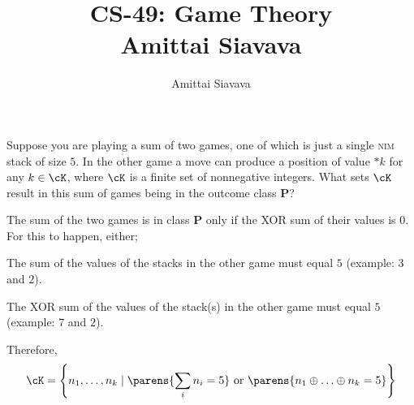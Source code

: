 \documentclass[11pt, reqno]{amsart}
\begin{document}

\title{CS-49: Game Theory\\ Amittai Siavava \\ }
\author{Amittai Siavava}


\setlength{\headheight}{13.0pt}
\setlength{\footskip}{15.0pt}

\maketitle

\bigskip

\def \cram { \textsc{cram} }
\def \dom { \textsc{domineering} }
\def \sub { \textsc{subtraction} }
\def \weighted { \textsc{weighted odds and evens}}
\def \nim { \textsc{nim} }
\def \P { \mathbf{P}}

\newpage
\begin{problem}[10]
  Suppose you are playing a sum of two games,
  one of which is just a single \nim stack of size $5$.
  In the other game a move can produce a position of value $\ast k$ for any $k \in \cK$,
  where $\cK$ is a finite set of nonnegative integers.
  What sets $\cK$ result in this sum of games being in the outcome class $\P$?

  The sum of the two games is in class $\P$ only if the XOR sum of their values is $0$.
  For this to happen, either;
  \begin{enumarabic}
    \item The sum of the values of the stacks in the other game must equal $5$
      (example: $3$ and $2$).
    \item The XOR sum of the values of the stack(s) in the other game must equal $5$
      (example: $7$ and $2$).
  \end{enumarabic}

  Therefore, \[ \cK = \set{ n_1, \ldots, n_k \mid \parens{\sum_i n_i = 5} \text{ or } \parens{n_1 \oplus \ldots \oplus n_k = 5} } \]
\end{problem}
\end{document}
